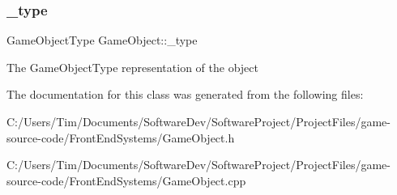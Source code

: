 \subsubsection{\texorpdfstring{\+\_\+type}{\_type}}
{\footnotesize\ttfamily Game\+Object\+Type Game\+Object\+::\+\_\+type\hspace{0.3cm}{\ttfamily [protected]}}

The Game\+Object\+Type representation of the object 

The documentation for this class was generated from the following files\+:\begin{DoxyCompactItemize}
\item 
C\+:/\+Users/\+Tim/\+Documents/\+Software\+Dev/\+Software\+Project/\+Project\+Files/game-\/source-\/code/\+Front\+End\+Systems/Game\+Object.\+h\item 
C\+:/\+Users/\+Tim/\+Documents/\+Software\+Dev/\+Software\+Project/\+Project\+Files/game-\/source-\/code/\+Front\+End\+Systems/Game\+Object.\+cpp\end{DoxyCompactItemize}
